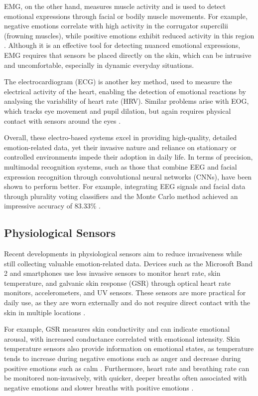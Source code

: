 EMG, on the other hand, measures muscle activity and is used to detect emotional expressions through facial or bodily muscle movements. For example, negative emotions correlate with high activity in the corrugator supercilii (frowning muscles), while positive emotions exhibit reduced activity in this region \cite{Suhaila2021-dh}. Although it is an effective tool for detecting nuanced emotional expressions, EMG requires that sensors be placed directly on the skin, which can be intrusive and uncomfortable, especially in dynamic everyday situations.

The electrocardiogram (ECG) is another key method, used to measure the electrical activity of the heart, enabling the detection of emotional reactions by analysing the variability of heart rate (HRV). Similar problems arise with EOG, which tracks eye movement and pupil dilation, but again requires physical contact with sensors around the eyes \cite{Dzedzickis2020-hf}.

Overall, these electro-based systems excel in providing high-quality, detailed emotion-related data, yet their invasive nature and reliance on stationary or controlled environments impede their adoption in daily life. In terms of precision, multimodal recognition systems, such as those that combine EEG and facial expression recognition through convolutional neural networks (CNNs), have been shown to perform better. For example, integrating EEG signals and facial data through plurality voting classifiers and the Monte Carlo method achieved an impressive accuracy of 83.33\% \cite{Tan2021-ai}.

\subsection{Physiological Sensors}
Recent developments in physiological sensors aim to reduce invasiveness while still collecting valuable emotion-related data. Devices such as the Microsoft Band 2 and smartphones use less invasive sensors to monitor heart rate, skin temperature, and galvanic skin response (GSR) through optical heart rate monitors, accelerometers, and UV sensors. These sensors are more practical for daily use, as they are worn externally and do not require direct contact with the skin in multiple locations \cite{Younis2022-bs}.

For example, GSR measures skin conductivity and can indicate emotional arousal, with increased conductance correlated with emotional intensity. Skin temperature sensors also provide information on emotional states, as temperature tends to increase during negative emotions such as anger and decrease during positive emotions such as calm \cite{Nawasalkar2017-fx}. Furthermore, heart rate and breathing rate can be monitored non-invasively, with quicker, deeper breaths often associated with negative emotions and slower breaths with positive emotions \cite{Younis2022-bs}. 

